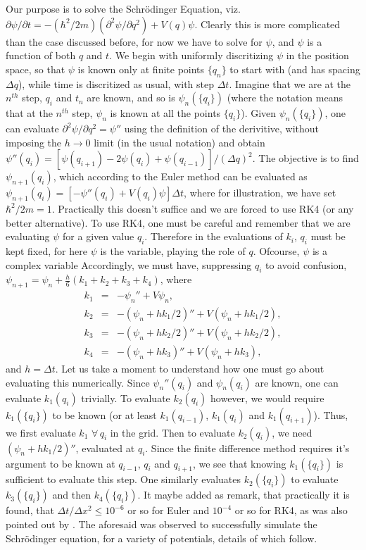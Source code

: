 Our purpose is to solve the Schr\"odinger Equation, viz. $\partial\psi/\partial t=-(\hbar^{2}/2m)(\partial^{2}\psi/\partial q^{2})+V(q)\psi$.
Clearly this is more complicated than the case discussed before, for
now we have to solve for $\psi$, and $\psi$ is a function of both
$q$ and $t$. We begin with uniformly discritizing $\psi$ in the
position space, so that $\psi$ is known only at finite points $\{q_{n}\}$
to start with (and has spacing $\Delta q$), while time is discritized
as usual, with step $\Delta t$. Imagine that we are at the $n^{th}$
step, $q_{i}$ and $t_{n}$ are known, and so is $\psi_{n}(\{q_{i}\})$
(where the notation means that at the $n^{th}$ step, $\psi_{n}$
is known at all the points $\{q_{i}\}$). Given $\psi_{n}(\{q_{i}\})$,
one can evaluate $\partial^{2}\psi/\partial q^{2}=\psi''$ using the
definition of the derivitive, without imposing the $h\to0$ limit
(in the usual notation) and obtain $\psi''(q_{i})=\left[\psi(q_{i+1})-2\psi(q_{i})+\psi(q_{i-1})\right]/(\Delta q)^{2}$.
The objective is to find $\psi_{n+1}(q_{i})$, which according to
the Euler method can be evaluated as $\psi_{n+1}(q_{i})=\left[-\psi''(q_{i})+V(q_{i})\psi\right]\Delta t$,
where for illustration, we have set $\hbar^{2}/2m=1$. Practically
this doesn't suffice and we are forced to use RK4 (or any better alternative).
To use RK4, one must be careful and remember that we are evaluating
$\psi$ for a given value $q_{i}$. Therefore in the evaluations of
$k_{i}$, $q_{i}$ must be kept fixed, for here $\psi$ is the variable,
playing the role of $q$. Ofcourse, $\psi$ is a complex variable
Accordingly, we must have, suppressing $q_{i}$ to avoid confusion,
$\psi_{n+1}=\psi_{n}+\frac{h}{6}(k_{1}+k_{2}+k_{3}+k_{4})$, where
\begin{eqnarray*}
k_{1} & = & -\psi_{n}''+V\psi_{n},\\
k_{2} & = & -(\psi_{n}+hk_{1}/2)''+V(\psi_{n}+hk_{1}/2),\\
k_{3} & = & -(\psi_{n}+hk_{2}/2)''+V(\psi_{n}+hk_{2}/2),\\
k_{4} & = & -(\psi_{n}+hk_{3})''+V(\psi_{n}+hk_{3}),
\end{eqnarray*}
and $h=\Delta t$. Let us take a moment to understand how one must
go about evaluating this numerically. Since $\psi_{n}''(q_{i})$ and
$\psi_{n}(q_{i})$ are known, one can evaluate $k_{1}(q_{i})$ trivially.
To evaluate $k_{2}(q_{i})$ however, we would require $k_{1}(\{q_{i}\})$
to be known (or at least $k_{1}(q_{i-1})$, $k_{1}(q_{i})$ and $k_{1}(q_{i+1})$).
Thus, we first evaluate $k_{1}$ $\forall\,q_{i}$ in the grid. Then
to evaluate $k_{2}(q_{i})$, we need $(\psi_{n}+hk_{1}/2)''$, evaluated
at $q_{i}$. Since the finite difference method requires it's argument
to be known at $q_{i-1}$, $q_{i}$ and $q_{i+1}$, we see that knowing
$k_{1}(\{q_{i}\})$ is sufficient to evaluate this step. One similarly
evaluates $k_{2}(\{q_{i}\})$ to evaluate $k_{3}(\{q_{i}\})$ and
then $k_{4}(\{q_{i}\})$. It maybe added as remark, that practically
it is found, that $\Delta t/\Delta x^{2}\le10^{-6}$ or so for Euler
and $10^{-4}$ or so for RK4, as was also pointed out by \cite{schrNum}.
The aforesaid was observed to successfully simulate the Schr\"odinger
equation, for a variety of potentials, details of which follow.


